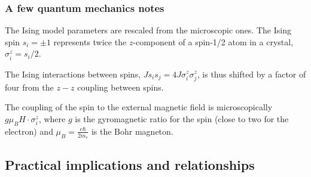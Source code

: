 \documentclass[hyperref={colorlinks=true}]{beamer}
\begin{document}
\begin{frame}%
  \frametitle{A few quantum mechanics notes}
  
  The Ising model parameters are rescaled from the microscopic ones. The Ising spin $s_i = \pm1$ represents twice the $z$-component of a spin-1/2 atom in a crystal, $\sigma_i^z = s_i/2$. 
  
  \vspace{0.5cm}
  
  The Ising interactions between spins, $J s_i s_j = 4 J \sigma_i^z \sigma_j^z$, is thus shifted by a factor of four from the $z-z$ coupling between spins. 
  
  \vspace{0.5cm}
  
  The coupling of the spin to the external magnetic field is microscopically $g \mu_B H \cdot \sigma_i^z$, where $g$ is the gyromagnetic ratio for the spin (close to two for the electron) and $\mu_B = \frac{e \hbar}{2 m_e}$ is the Bohr magneton. 
  
  \vspace{0.5cm}
  

\end{frame}



\subsection[Practical implications and relationships]{Practical implications and relationships}
\end{document}
